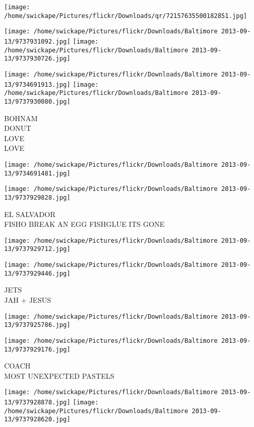 \documentclass[10pt,letterpaper]{article}
\begin{document}
\texttt{[image: /home/swickape/Pictures/flickr/Downloads/qr/72157635500182851.jpg]}
\pagebreak

\texttt{[image: /home/swickape/Pictures/flickr/Downloads/Baltimore 2013-09-13/9737931092.jpg]}
\texttt{[image: /home/swickape/Pictures/flickr/Downloads/Baltimore 2013-09-13/9737930726.jpg]}

\texttt{[image: /home/swickape/Pictures/flickr/Downloads/Baltimore 2013-09-13/9734691913.jpg]}
\texttt{[image: /home/swickape/Pictures/flickr/Downloads/Baltimore 2013-09-13/9737930080.jpg]}

BOHNAM\\
DONUT\\
LOVE\\
LOVE
\pagebreak

\texttt{[image: /home/swickape/Pictures/flickr/Downloads/Baltimore 2013-09-13/9734691481.jpg]}

\vspace{0.25in}
\texttt{[image: /home/swickape/Pictures/flickr/Downloads/Baltimore 2013-09-13/9737929828.jpg]}

EL SALVADOR\\
FISHO BREAK AN EGG FISHGLUE ITS GONE
\pagebreak

\texttt{[image: /home/swickape/Pictures/flickr/Downloads/Baltimore 2013-09-13/9737929712.jpg]}

\vspace{0.25in}
\texttt{[image: /home/swickape/Pictures/flickr/Downloads/Baltimore 2013-09-13/9737929446.jpg]}

JETS\\
JAH + JESUS
\pagebreak

\texttt{[image: /home/swickape/Pictures/flickr/Downloads/Baltimore 2013-09-13/9737925786.jpg]}

\vspace{0.25in}
\texttt{[image: /home/swickape/Pictures/flickr/Downloads/Baltimore 2013-09-13/9737929176.jpg]}

COACH\\
MOST UNEXPECTED PASTELS
\pagebreak

\texttt{[image: /home/swickape/Pictures/flickr/Downloads/Baltimore 2013-09-13/9737928878.jpg]}
\texttt{[image: /home/swickape/Pictures/flickr/Downloads/Baltimore 2013-09-13/9737928620.jpg]}
\end{document}

